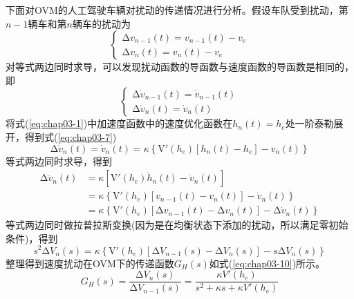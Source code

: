 下面对OVM的人工驾驶车辆对扰动的传递情况进行分析。假设车队受到扰动，第$n-1$辆车和第$n$辆车的扰动为
\begin{equation}
  \begin{cases}
    \increment{v_{n-1}(t)} = v_{n-1}(t) - v_e \\
    \increment{v_n(t)} = v_n(t) - v_e
  \end{cases}
  \label{eq:chap03-5}
\end{equation}
对等式两边同时求导，可以发现扰动函数的导函数与速度函数的导函数是相同的，即
\begin{equation}
  \begin{cases}
    \increment{\dot{v}_{n-1}(t)} = \dot{v}_{n-1}(t) \\
    \increment{\dot{v}_n(t)} = \dot{v}_n(t)
  \end{cases}
  \label{eq:chap03-6}
\end{equation}
将式(\ref{eq:chap03-1})中加速度函数中的速度优化函数在$h_n(t)=h_e$处一阶泰勒展开，得到式(\ref{eq:chap03-7})
\begin{equation}
  \increment{\dot{v}}_n(t) = \dot{v}_n(t) = \kappa \left\{ \mathrm{V'}(h_e)[h_n(t)-h_e] - v_n(t) \right\}
  \label{eq:chap03-7}
\end{equation}
等式两边同时求导，得到
\begin{equation}
  \begin{aligned}
    \increment{\ddot{v}}_n(t) &= \kappa \left[ \mathrm{V'}(h_e)\dot{h}_n(t) - \dot{v}_n(t) \right] \\
                              &= \kappa \left\{ \mathrm{V'}(h_e)\left[v_{n-1}(t) - v_n(t)\right] - \dot{v}_n(t) \right\} \\
                              &= \kappa \left\{ \mathrm{V'}(h_e)\left[\increment{v_{n-1}(t)} - \increment{v_n(t)} \right] - \increment{\dot{v}_n(t)} \right\}
  \end{aligned}       
  \label{eq:chap03-8}
\end{equation}
等式两边同时做拉普拉斯变换(因为是在均衡状态下添加的扰动，所以满足零初始条件)，得到
\begin{equation}
  s^2\increment{V}_n(s) = \kappa \left\{ \mathrm{V'}(h_e)\left[\increment{V_{n-1}(s)} - \increment{V_n(s)} \right] - s\increment{V_n(s)} \right\}
  \label{eq:chap03-9}
\end{equation}
整理得到速度扰动在OVM下的传递函数$G_{H}(s)$如式(\ref{eq:chap03-10})所示。
\begin{equation}
  G_{H}(s) = \frac{\increment{V_{n}(s)}}{\increment{V_{n-1}(s)}} = \frac{\kappa V'(h_e)}{s^2 + \kappa s + \kappa V'(h_e)}
  \label{eq:chap03-10}
\end{equation}

